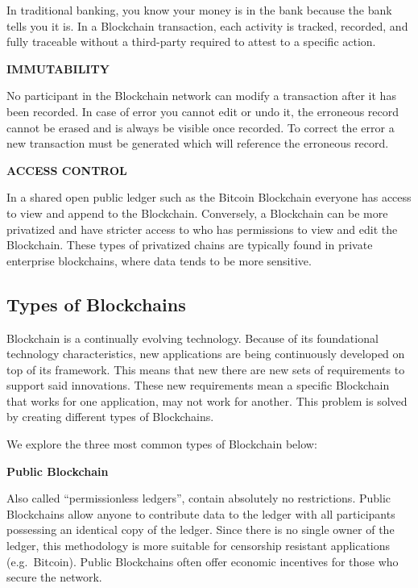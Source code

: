\documentclass[11pt]{article}
\begin{document}
In traditional banking, you know your money is in the bank because the
bank tells you it is. In a Blockchain transaction, each activity is
tracked, recorded, and fully traceable without a third-party required to
attest to a specific action.

    \textbf{IMMUTABILITY}

No participant in the Blockchain network can modify a transaction after
it has been recorded. In case of error you cannot edit or undo it, the
erroneous record cannot be erased and is always be visible once
recorded. To correct the error a new transaction must be generated which
will reference the erroneous record.

    \textbf{ACCESS CONTROL}

In a shared open public ledger such as the Bitcoin Blockchain everyone
has access to view and append to the Blockchain. Conversely, a
Blockchain can be more privatized and have stricter access to who has
permissions to view and edit the Blockchain. These types of privatized
chains are typically found in private enterprise blockchains, where data
tends to be more sensitive.

    \hypertarget{types-of-blockchains}{%
\subsection{Types of Blockchains}\label{types-of-blockchains}}

    Blockchain is a continually evolving technology. Because of its
foundational technology characteristics, new applications are being
continuously developed on top of its framework. This means that new
there are new sets of requirements to support said innovations. These
new requirements mean a specific Blockchain that works for one
application, may not work for another. This problem is solved by
creating different types of Blockchains.

    We explore the three most common types of Blockchain below:

    \textbf{Public Blockchain}

Also called ``permissionless ledgers'', contain absolutely no
restrictions. Public Blockchains allow anyone to contribute data to the
ledger with all participants possessing an identical copy of the ledger.
Since there is no single owner of the ledger, this methodology is more
suitable for censorship resistant applications (e.g.~Bitcoin). Public
Blockchains often offer economic incentives for those who secure the
network.
\end{document}
